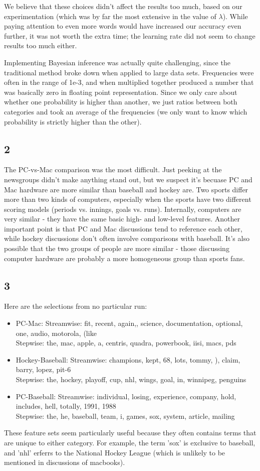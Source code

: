 \documentclass{article}
\begin{document}
  We believe that these choices didn't affect the results too much, based on our experimentation (which was by far the most extensive in the value of $\lambda$). While paying attention to even more words would have increased our accuracy even further, it was not worth the extra time; the learning rate did not seem to change results too much either.

  Implementing Bayesian inference was actually quite challenging, since the traditional method broke down when applied to large data sets. Frequencies were often in the range of 1e-3,
  and when multiplied together produced a number that was basically zero in floating point representation. Since we only care about whether one probability is higher than another, 
  we just ratios between both categories and took an average of the frequencies (we only want to know which probability is strictly higher than the other).

\subsection{2}
The PC-vs-Mac comparison was the most difficult. Just peeking at the newsgroups didn't make anything stand out, but we suspect it's becuase PC and Mac hardware are more similar than baseball and hockey are.
Two sports differ more than two kinds of computers, especially when the sports have two different scoring models (periods vs. innings, goals vs. runs).
Internally, computers are very similar - they have the same basic high- and low-level features.
Another important point is that PC and Mac discussions tend to reference each other, while hockey discussions don't often involve comparisons with baseball.
It's also possible that the two groups of people are more similar - those discussing computer hardware are probably a more homogeneous group than sports fans.

\subsection{3}
Here are the selections from no particular run:

\begin{itemize}
  \item PC-Mac: Streamwise: fit, recent, again,, science, documentation, optional, one, audio, motorola, (like\\
Stepwise: the, mac, apple, a, centris, quadra, powerbook, iisi, macs, pds

\item Hockey-Baseball: Streamwise: champions, kept, 68, lots, tommy, ), claim, barry, lopez, pit-6\\
Stepwise: the, hockey, playoff, cup, nhl, wings, goal, in, winnipeg, penguins

\item PC-Baseball: Streamwise: individual, losing, experience, company, hold, includes, hell, totally, 1991, 1988\\
Stepwise: the, he, baseball, team, i, games, sox, system, article, mailing
\end{itemize}

  These feature sets seem particularly useful because they often contains terms that are unique to either category. 
  For example, the term 'sox' is exclusive to baseball, and 'nhl' erferrs to the National Hockey League (which is
  unlikely to be mentioned in discussions of macbooks).
\end{document}
